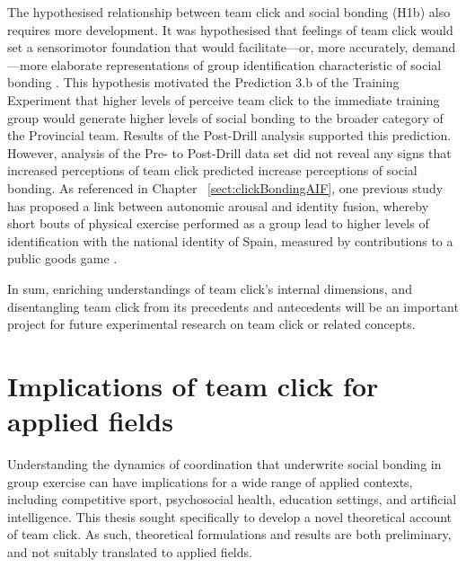 

The hypothesised relationship between team click and social bonding (H1b) also requires more development.  It was hypothesised that feelings of team click would set a sensorimotor foundation that would facilitate—or, more accurately, demand---more elaborate representations of group identification characteristic of social bonding \citep{Pezzulo2014}.  This hypothesis motivated the Prediction 3.b of the Training Experiment that higher levels of perceive team click to the immediate training group would generate higher levels of social bonding to the broader category of the Provincial team.  Results of the Post-Drill analysis supported this prediction. However, analysis of the Pre- to Post-Drill data set did not reveal any signs that increased perceptions of team click predicted increase perceptions of social bonding.  As referenced in Chapter ~\ref{sect:clickBondingAIF}, one previous study has proposed a link between autonomic arousal and identity fusion, whereby short bouts of physical exercise performed as a group lead to higher levels of identification with the national identity of Spain, measured by contributions to a public goods game \citep[824][]{Swann2010}.

In sum, enriching understandings of team click's internal dimensions, and disentangling team click from its precedents and antecedents will be an important project for future experimental research on team click or related concepts.


\section{Implications of team click for applied fields}
Understanding the dynamics of coordination that underwrite social bonding in group exercise can have implications for a wide range of applied contexts, including competitive sport, psychosocial health, education settings, and artificial intelligence.  This thesis sought specifically to develop a novel theoretical account of team click. As such, theoretical formulations and results are both preliminary, and not suitably translated to applied fields.



